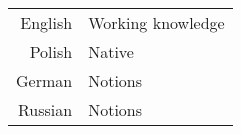 \begin{leftcolumn*}
{{\begin{minipage}[l]{0.9\leftcolwidth}
                \vspace{\itemspace}\\
                \vspace{\itemspace}\\
                \vspace{\itemspace}\\
            \end{minipage} %
        }%
    } %
    \vspace{\itemspace}\\ 
    {\color{white} 
        \phantom{} \\ %
        \begin{minipage}[r]{\leftcolwidth}
            \begin{tabular}{r|l}
                English & Working knowledge\\[0.3em]
                Polish & Native\\[0.3em]
                German & Notions\\[0.3em]
                Russian & Notions
            \end{tabular}
        \end{minipage} %
    } %
    \end{leftcolumn*}

